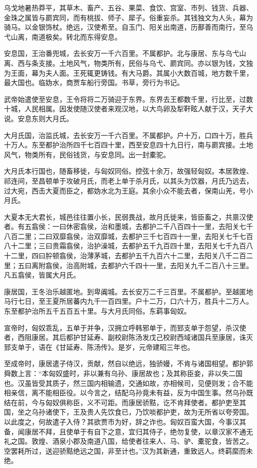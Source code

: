 \documentclass[]{article}
\begin{document}
乌戈地暑热莽平，其草木、畜产、五谷、果菜、食饮、宫室、市列、钱货、兵器、金珠之属皆与罽宾同，而有桃拔、师子、犀子。俗重妄杀。其钱独文为人头，幕为骑马。以金银饰杖。绝远，汉使希至。自玉门、阳关出南道，历鄯善而南行，至乌弋山离，南道极矣。转北而东得安息。

安息国，王治番兜城，去长安万一千六百里。不属都护。北与康居、东与乌弋山离、西与条支接。土地风气，物类所有，民俗与乌弋、罽宾同。亦以银为钱，文独为王面，幕为夫人面。王死辄更铸钱。有大马爵。其属小大数百城，地方数千里，最大国也。临妫水，商贾车船行旁国。书草，旁行为书记。

武帝始遣使至安息，王令将将二万骑迎于东界。东界去王都数千里，行比至，过数十城，人民相属。因发使随汉使者来观汉地，以大鸟卵及犁靬眩人献于汉，天子大说。安息东则大月氏。

大月氏国，治监氏城，去长安万一千六百里。不属都护。户十万，口四十万，胜兵十万人。东至都护治所四千七百四十里，西至安息四十九日行，南与罽宾接。土地风气，物类所有，民俗钱货，与安息同。出一封橐驼。

大月氏本行国也，随畜移徙，与匈奴同俗。控弦十余万，故强轻匈奴。本居敦煌、祁连间，至昌顿单于攻破月氏，而老上单于杀月氏，以其头为饮器，月氏乃远去，过大宛，西击大夏而臣之，都妫水北为王庭。其余小众不能去者，保南山羌，号小月氏。

大夏本无大君长，城邑往往置小长，民弱畏战，故月氏徙来，皆臣畜之，共禀汉使者。有五翕侯：一曰休密翕侯，治和墨城，去都护二千八百四十一里，去阳关七千八百二里；二曰双靡翕侯，治双靡城，去都护三千七百四十一里，去阳关七千七百八十二里；三曰贵霜翕侯，治护澡城，去都护五千九百四十里，去阳关七千九百八十二里，四曰肸顿翕侯，治薄茅城，去都护五千九百六十二里，去阳关八千二百二里；五曰离附翕侯，治高附城，去都护六千四十一里，去阳关九千二百八十三里。凡五翕侯，皆属大月氏。

康居国，王冬治乐越匿地。到卑阗城。去长安万二千三百里。不属都护。至越匿地马行七日，至王夏所居蕃内九千一百四里。户十二万，口六十万，胜兵十二万人。东至都护治所五千五百五十里。与大月氏同俗。东羁事匈奴。

宣帝时，匈奴乖乱，五单于并争，汉拥立呼韩邪单于，而郅支单于怨望，杀汉使者，西阻康居。其后都护甘延寿、副校尉陈汤发戊己校尉西域诸国兵至康居，诛灭郅支单于，语在《甘延寿、陈汤传》。是岁，元帝建昭三年也。

至成帝时，康居遣子侍汉，贡献，然自以绝远，独骄嫚，不肯与诸国相望。都护郭舜数上言：``本匈奴盛时，非以兼有乌孙、康居故也；及其称臣妾，非以失二国也。汉虽皆受其质子，然三国内相输遗，交通如故，亦相候司，见便则发；合不能相亲信，离不能相臣役。以今言之，结配乌孙竟未有益，反为中国生事。然乌孙既结在前，今与匈奴俱称臣，义不可距。而康居骄黠，讫不肯拜使者。都护吏至其国，坐之乌孙诸使下，王及贵人先饮食已，乃饮啖都护吏，故为无所省以夸旁国。以此度之，何故遣子入侍？其欲贾市为好，辞之诈也。匈奴百蛮大国，今事汉其备，闻康居不拜，且使单于有自下之意，宜归其侍子，绝勿复使，以章汉家不通无礼之国。敦煌、酒泉小郡及南道八国，给使者往来人、马、驴、橐驼食，皆苦之。空罢耗所过，送迎骄黠绝远之国，非至计也。''汉为其新通，重致远人。终羁縻而未绝。
\end{document}
